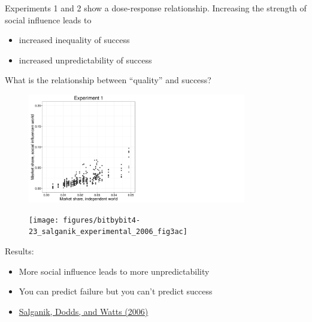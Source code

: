 \documentclass[aspectratio=169]{beamer}
\begin{document}
\begin{frame}

Experiments 1 and 2 show a dose-response relationship.  Increasing the strength of social influence leads to

\begin{itemize}
  \item increased inequality of success
  \item increased unpredictability of success
\end{itemize}

\end{frame}
\begin{frame}

What is the relationship between ``quality'' and success?

\end{frame}
\begin{frame}

\begin{figure}
  \centering
  \includegraphics[width=0.85\textwidth]{figures/bitbybit4-23_salganik_experimental_2006_fig3a}
\end{figure}

\end{frame}
\begin{frame}

\begin{figure}
  \texttt{[image: figures/bitbybit4-23\_salganik\_experimental\_2006\_fig3ac]}
\end{figure}

Results: \pause
\begin{itemize}
\item More social influence leads to more unpredictability
\pause
\item You can predict failure but you can't predict success
\pause 
\item \href{http://dx.doi.org/10.1126/science.1121066}{Salganik, Dodds, and Watts (2006)}
\end{itemize}
 
\end{frame}
\end{document}
